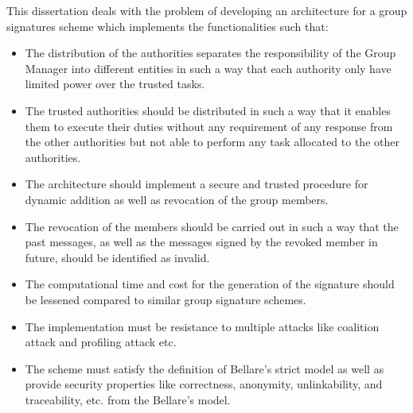 This dissertation deals with the problem of developing an architecture for a group signatures scheme which implements the functionalities such that:
\begin{itemize}
\item The distribution of the authorities separates the responsibility of the Group Manager into different entities in such a way that each authority only have limited power over the trusted tasks.
\item The trusted authorities should be distributed in such a way that it enables them to execute their duties without any requirement of any response from the other authorities but not able to perform any task allocated to the other authorities.
\item The architecture should implement a secure and trusted procedure for dynamic addition as well as revocation of the group members.
\item The revocation of the members should be carried out in such a way that the past messages, as well as the messages signed by the revoked member in future, should be identified as invalid.
\item The computational time and cost for the generation of the signature should be lessened compared to similar group signature schemes.
\item The implementation must be resistance to multiple attacks like coalition attack and profiling attack etc.
\item The scheme must satisfy the definition of Bellare's strict model \cite{bellare2003foundations} as well as provide security properties like correctness, anonymity, unlinkability, and traceability, etc. from the Bellare's model. 
\end{itemize}